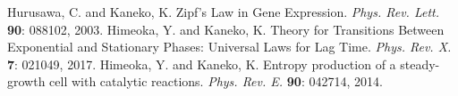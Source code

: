 \documentclass[a4paper,11pt]{jsarticle}
\begin{document}
\begin{thebibliography}{99}
   Hurusawa, C. and Kaneko, K. Zipf's Law in Gene Expression. \textit{Phys. Rev. Lett.} \textbf{90}: 088102, 2003.
   Himeoka, Y. and Kaneko, K. Theory for Transitions Between Exponential and Stationary Phases:
  Universal Laws for Lag Time. \textit{Phys. Rev. X.} \textbf{7}: 021049, 2017.  
   Himeoka, Y. and Kaneko, K. Entropy production of a steady-growth cell with catalytic reactions. \textit{Phys. Rev. E.} \textbf{90}: 042714, 2014.  
\end{thebibliography}
\end{document}
